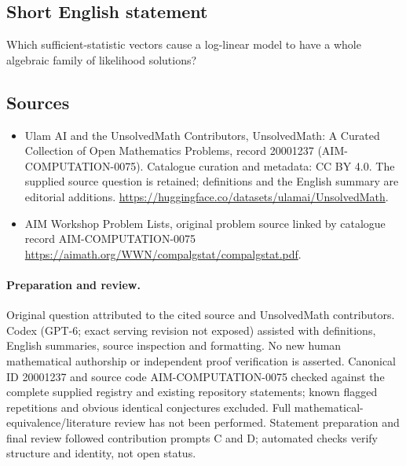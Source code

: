 \documentclass[11pt]{article}
\begin{document}
\subsection{Short English statement}
Which sufficient-statistic vectors cause a log-linear model to have a whole algebraic family of likelihood solutions?
\subsection{Sources}
\begin{itemize}
\item[\hypertarget{source:20001237:1}{S1}] Ulam AI and the UnsolvedMath Contributors, UnsolvedMath: A Curated Collection of Open Mathematics Problems, record 20001237 (AIM-COMPUTATION-0075). Catalogue curation and metadata: CC BY 4.0. The supplied source question is retained; definitions and the English summary are editorial additions.
\url{https://huggingface.co/datasets/ulamai/UnsolvedMath}.
\item[\hypertarget{source:20001237:2}{S2}] AIM Workshop Problem Lists, original problem source linked by catalogue record AIM-COMPUTATION-0075
\url{https://aimath.org/WWN/compalgstat/compalgstat.pdf}.
\end{itemize}
\paragraph{Preparation and review.}
Original question attributed to the cited source and UnsolvedMath contributors. Codex (GPT-6; exact serving revision not exposed) assisted with definitions, English summaries, source inspection and formatting. No new human mathematical authorship or independent proof verification is asserted. Canonical ID 20001237 and source code AIM-COMPUTATION-0075 checked against the complete supplied registry and existing repository statements; known flagged repetitions and obvious identical conjectures excluded. Full mathematical-equivalence/literature review has not been performed. Statement preparation and final review followed contribution prompts C and D; automated checks verify structure and identity, not open status.
\label{end:20001237}
\end{document}
